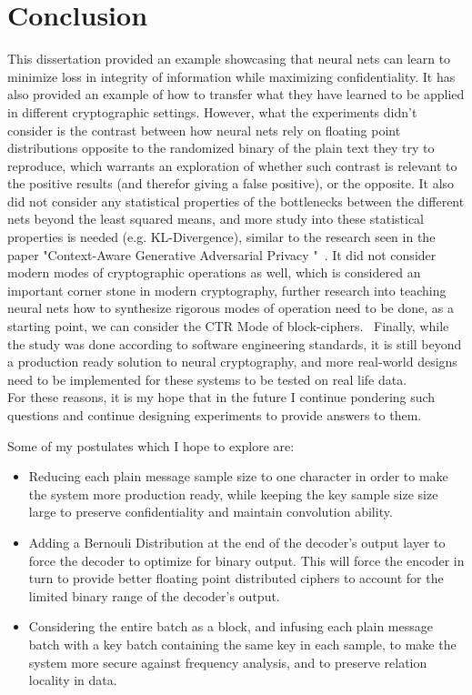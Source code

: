 \documentclass[a4paper, 12pt]{report}
\begin{document}
\chapter{Conclusion}\label{sec:conclusion}
\begin{center}
	\begin{minipage}{0.8\textwidth}
		\justify
		This dissertation provided an example showcasing that neural nets can learn to minimize loss in integrity of information while maximizing confidentiality. It has also provided an example of how to transfer what they have learned to be applied in different cryptographic settings.
		However, what the experiments didn't consider is the contrast between how neural nets rely on floating point distributions opposite to the randomized binary of the plain text they try to reproduce, which warrants an exploration of whether such contrast is relevant to the positive results (and therefor giving a false positive), or the opposite.
		It also did not consider any statistical properties of the bottlenecks between the different nets beyond the least squared means, and more study into these statistical properties is needed (e.g. KL-Divergence), similar to the research seen in the paper "Context-Aware Generative Adversarial Privacy
		"~\citep{e19120656}.
		It did not consider modern modes of cryptographic operations as well, which is considered an important corner stone in modern cryptography, further research into teaching neural nets how to synthesize rigorous modes of operation need to be done, as a starting point, we can consider the CTR Mode of block-ciphers.~\citep{BlockCipherModes}
		Finally, while the study was done according to software engineering standards, it is still beyond a production ready solution to neural cryptography, and more real-world designs need to be implemented for these systems to be tested on real life data.\\
		For these reasons, it is my hope that in the future I continue pondering such questions and continue designing experiments to provide answers to them.
	\end{minipage}
\end{center}
Some of my postulates which I hope to explore are:
\begin{itemize}
	\item Reducing each plain message sample size to one character in order to make the system more production ready, while keeping the key sample size size large to preserve confidentiality and maintain convolution ability.
	\item Adding a Bernouli Distribution at the end of the decoder's output layer to force the decoder to optimize for binary output. This will force the encoder in turn to provide better floating point distributed ciphers to account for the limited binary range of the decoder's output.
	\item Considering the entire batch as a block, and infusing each plain message batch with a key batch containing the same key in each sample, to make the system more secure against frequency analysis, and to preserve relation locality in data.
\end{itemize}
\end{document}
